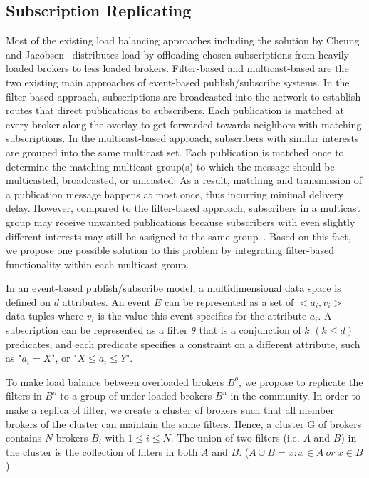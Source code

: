\subsection{Subscription Replicating}\label{Chap5_03_02}
Most of the existing load balancing approaches including the solution by Cheung and Jacobsen~\cite{AKYCheung2010} distributes load by offloading chosen subscriptions from heavily loaded brokers to less loaded brokers. Filter-based and multicast-based are the two existing main approaches of event-based publish/subscribe systems. In the filter-based approach, subscriptions are broadcasted into the network to establish routes that direct publications to subscribers. Each publication is matched at every broker along the overlay to get forwarded towards neighbors with matching subscriptions. In the multicast-based approach, subscribers with similar interests are grouped into the same multicast set. Each publication is matched once to determine the matching multicast group(s) to which the message should be multicasted, broadcasted, or unicasted. As a result, matching and transmission of a publication message happens at most once, thus incurring minimal delivery delay. However, compared to the filter-based approach, subscribers in a multicast group may receive unwanted publications because subscribers with even slightly different interests may still be assigned to the same group~\cite{FCao2004}. Based on this fact, we propose one possible solution to this problem by integrating filter-based functionality within each multicast group.

In an event-based publish/subscribe model, a multidimensional data space is defined on $d$ attributes. An event $E$ can be represented as a set of $<a_i, v_i>$ data tuples where $v_i$ is the value this event specifies for the attribute $a_i$. A subscription can be represented as a filter $\theta$ that is a conjunction of $k$ $(k \leq d)$ predicates, and each predicate specifies a constraint on a different attribute, such as "$a_i=X$", or "$X \leq a_i \leq Y$".

To make load balance between overloaded brokers $B^o$, we propose to replicate the filters in $B^o$ to a group of under-loaded brokers $B^u$ in the community. In order to make a replica of filter, we create a cluster of brokers such that all member brokers of the cluster can maintain the same filters. Hence, a cluster G of brokers contains $N$ brokers $B_i$ with $1 \leq i \leq N$. The union of two filters (i.e. $A$ and $B$) in the cluster is the collection of filters in both $A$ and $B$. ($A \cup B={x:x \in A~or~x \in B}$)

